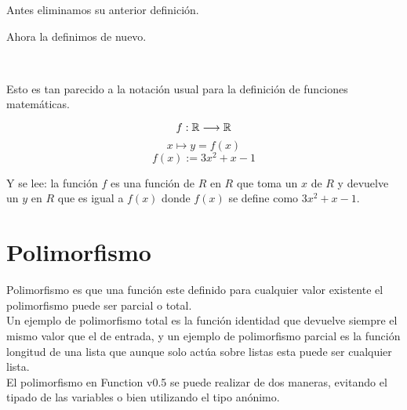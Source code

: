       Antes eliminamos su anterior definición.
      
      \begin{fxcode}
          
      \end{fxcode}
      
      Ahora la definimos de nuevo.
      
      \begin{fxcode}
         \\
      \end{fxcode}
      
      Esto es tan parecido a la notación usual para la definición de funciones matemáticas.
      
      $$f : \mathbb{R}  \longrightarrow  \mathbb{R}$$
      $$x \longmapsto y = f(x)$$
      $$f(x) := 3x^2 + x - 1$$
      
      Y se lee: la función $f$ es una función de $R$ en $R$ que toma un $x$ de $R$ y devuelve un $y$ en $R$ que es igual a $f(x)$ donde $f(x)$ se define como $3x^2 + x - 1$.
      
   \section{Polimorfismo}
      Polimorfismo es que una función este definido para cualquier valor existente el polimorfismo puede ser parcial o total.
      \\
      
      Un ejemplo de polimorfismo total es la función identidad que devuelve siempre el mismo valor que el de entrada, y un ejemplo de polimorfismo parcial es la función longitud de una lista que aunque solo actúa sobre listas esta puede ser cualquier lista.
      \\
      
      El polimorfismo en Function v0.5 se puede realizar de dos maneras, evitando el tipado de las variables o bien utilizando el tipo anónimo.
      \\
      
      \begin{fxcode}
          \\
          \\
         \\
          
      \end{fxcode}
      
